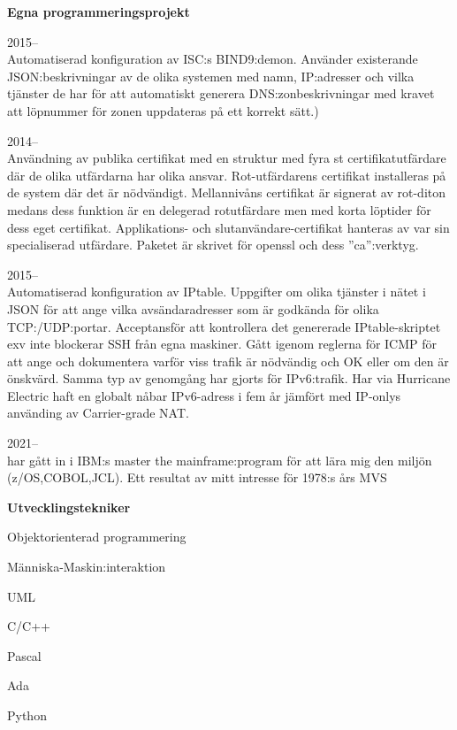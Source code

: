 \documentclass[a4paper,swedish,11pt]{article}
\newenvironment*{descriptioncv}[1]%
{%
  \textbf{\normalsize #1}%
  \begin{description}[nosep,font=\sffamily\bfseries, leftmargin=0.5cm,style=nextline]%
  }%
  {\end{description}\vspace{0.4cm}}
\newcommand*{\cvitem}[3]{\item[#1]{\cinzel\normalsize#2}\\#3}
\begin{document}
\begin{minipage}[t]{0.73\textwidth}
  \begin{descriptioncv}{Egna programmeringsprojekt}
    \cvitem{Automatisering av BIND}{2015--}{Automatiserad konfiguration av ISC:s BIND9:demon.
      Använder existerande JSON:beskrivningar av
      de olika systemen med namn, IP:adresser och vilka tjänster de har för att automatiskt generera DNS:zonbeskrivningar
      med kravet att löpnummer för zonen uppdateras på ett korrekt sätt.)}
    \cvitem{PKI:funktionalitet}{2014--}{Användning av publika certifikat med en struktur med fyra st
      certifikatutfärdare där de olika utfärdarna har olika ansvar.
      Rot-utfärdarens certifikat installeras på de system där det är nödvändigt.
      Mellannivåns certifikat är signerat av rot-diton medans dess funktion är en delegerad rotutfärdare
      men med korta löptider för dess eget certifikat.
      Applikations- och slutanvändare-certifikat hanteras av var sin specialiserad utfärdare.
      Paketet är skrivet för openssl och dess ''ca'':verktyg.}
    \cvitem{Automatisering av brandväggsregler}{2015--}{Automatiserad konfiguration av IPtable. Uppgifter om olika tjänster
      i nätet i JSON för att ange vilka avsändaradresser som är godkända för olika TCP:/UDP:portar. Acceptansför att
      kontrollera det genererade IPtable-skriptet exv inte blockerar SSH från egna maskiner. Gått igenom
      reglerna för ICMP för att ange och dokumentera varför viss trafik är nödvändig och OK eller om den är önskvärd.
      Samma typ av genomgång har gjorts för IPv6:trafik. Har via Hurricane Electric haft en globalt nåbar IPv6-adress
      i fem år jämfört med IP-onlys använding av Carrier-grade NAT.}
   \cvitem{IBM:s master the mainframe:program}{2021--}{har gått in i IBM:s master the mainframe:program
      för att lära mig den miljön (z/OS,COBOL,JCL). Ett resultat av mitt intresse för 1978:s års MVS}
  \end{descriptioncv}

  \textbf{Utvecklingstekniker}
  \begin{description}[nosep]
    \small
  \item Objektorienterad programmering
  \item Människa-Maskin:interaktion
  \item UML
  \item C/C++
  \item Pascal
  \item Ada
  \item Python
  \end{description}


\end{minipage}
\end{document}
